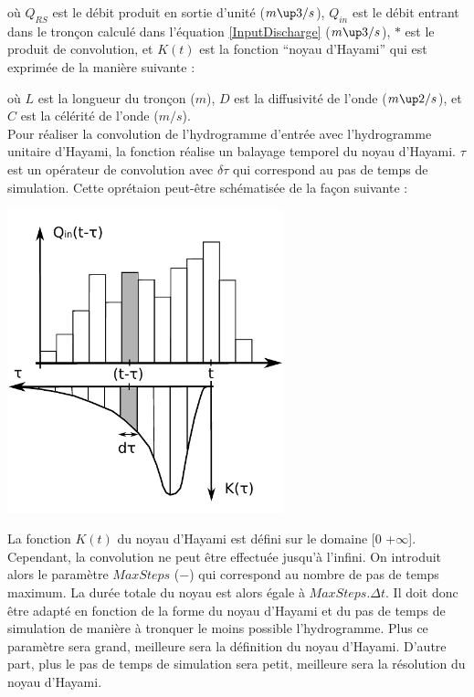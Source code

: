 

où $Q_{RS}$ est le débit produit en sortie d'unité ($m\up3/s$), $Q_{in}$ est le débit entrant dans le tronçon calculé dans l'équation \ref{InputDischarge} ($m\up3/s$), $*$ est le produit de convolution, et $K(t)$ est la fonction ``noyau d'Hayami'' qui est exprimée de la manière suivante :



où $L$ est la longueur du tronçon ($m$), $D$ est la diffusivité de l'onde ($m\up2/s$), et $C$ est la célérité de l'onde ($m/s$).\\

Pour réaliser la convolution de l'hydrogramme d'entrée avec l'hydrogramme unitaire d'Hayami, la fonction réalise un balayage temporel du noyau d'Hayami. $\tau$ est un opérateur de convolution avec $\delta \tau$ qui correspond au pas de temps de simulation. Cette oprétaion peut-être schématisée de la façon suivante :

\includegraphics[width=8cm]{common/Convolution_HayamiRS.pdf}

La fonction $K(t)$ du noyau d'Hayami est défini sur le domaine [0 +$\infty$]. Cependant, la convolution ne peut être effectuée jusqu'à l'infini. On introduit alors le paramètre $MaxSteps$ ($-$) qui correspond au nombre de pas de temps maximum. La durée totale du noyau est alors égale à $MaxSteps . \Delta t$. Il doit donc être adapté en fonction de la forme du noyau d'Hayami et du pas de temps de simulation de manière à tronquer le moins possible l'hydrogramme. Plus ce paramètre sera grand, meilleure sera la définition du noyau d'Hayami. D'autre part, plus le pas de temps de simulation sera petit, meilleure sera la résolution du noyau d'Hayami.\\

